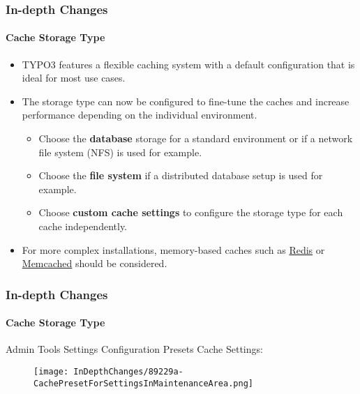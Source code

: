 \begin{frame}[fragile]
	\frametitle{In-depth Changes}
	\framesubtitle{Cache Storage Type}

	\begin{itemize}

		\item TYPO3 features a flexible caching system with a default configuration
			that is ideal for most use cases.
		\item The storage type can now be configured to fine-tune the caches and
			increase performance depending on the individual environment.

			\begin{itemize}
				\item Choose the \textbf{database} storage for a standard environment
					or if a network file system (NFS) is used for example.
				\item Choose the \textbf{file system} if a distributed database setup
					is used for example.
				\item Choose \textbf{custom cache settings} to configure the storage
					type for each cache independently.
			\end{itemize}

		\item For more complex installations, memory-based caches such as
			\href{https://redis.io/}{Redis}
			or
			\href{https://memcached.org/}{Memcached}
			should be considered.

	\end{itemize}

\end{frame}


\begin{frame}[fragile]
	\frametitle{In-depth Changes}
	\framesubtitle{Cache Storage Type}

	Admin Tools \hspace{0.1cm}Settings \hspace{0.1cm}Configuration Presets \hspace{0.1cm}Cache Settings:

	\begin{figure}
		\texttt{[image: InDepthChanges/89229a-CachePresetForSettingsInMaintenanceArea.png]}
	\end{figure}

\end{frame}

